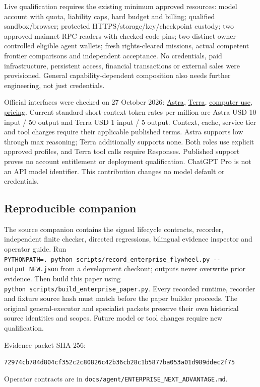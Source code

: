 \documentclass[
  10pt,
]{article}
\begin{document}
Live qualification requires the existing minimum approved resources:
model account with quota, liability caps, hard budget and billing;
qualified sandbox/browser; protected HTTPS/storage/key/checkpoint
custody; two approved mainnet RPC readers with checked code pins; two
distinct owner-controlled eligible agent wallets; fresh rights-cleared
missions, actual competent frontier comparisons and independent
acceptance. No credentials, paid infrastructure, persistent access,
financial transactions or external sales were provisioned. General
capability-dependent composition also needs further engineering, not
just credentials.

Official interfaces were checked on 27 October 2026:
\href{https://developers.openai.com/api/docs/models/gpt-6-astra}{Astra},
\href{https://developers.openai.com/api/docs/models/gpt-6.1-terra}{Terra},
\href{https://developers.openai.com/api/docs/guides/tools-computer-use}{computer
use}, \href{https://developers.openai.com/api/docs/pricing}{pricing}.
Current standard short-context token rates per million are Astra USD 10
input / 50 output and Terra USD 1 input / 5 output. Context, cache,
service tier and tool charges require their applicable published terms.
Astra supports low through max reasoning; Terra additionally supports
none. Both roles use explicit approved profiles, and Terra tool calls
require Responses. Published support proves no account entitlement or
deployment qualification. ChatGPT Pro is not an API model identifier.
This contribution changes no model default or credentials.

\hypertarget{reproducible-companion}{%
\subsection{Reproducible companion}\label{reproducible-companion}}

The source companion contains the signed lifecycle contracts, recorder,
independent finite checker, directed regressions, bilingual evidence
inspector and operator guide. Run
\texttt{PYTHONPATH=.\ python\ scripts/record\_enterprise\_flywheel.py\ -\/-output\ NEW.json}
from a development checkout; outputs never overwrite prior evidence.
Then build this paper using
\texttt{python\ scripts/build\_enterprise\_paper.py}. Every recorded
runtime, recorder and fixture source hash must match before the paper
builder proceeds. The original general-executor and specialist packets
preserve their own historical source identities and scopes. Future model
or tool changes require new qualification.

Evidence packet SHA-256:

\texttt{72974cb784d804cf352c2c80826c42b36cb28c1b5877ba053a01d989ddec2f75}

Operator contracts are in
\texttt{docs/agent/ENTERPRISE\_NEXT\_ADVANTAGE.md}.
\end{document}
